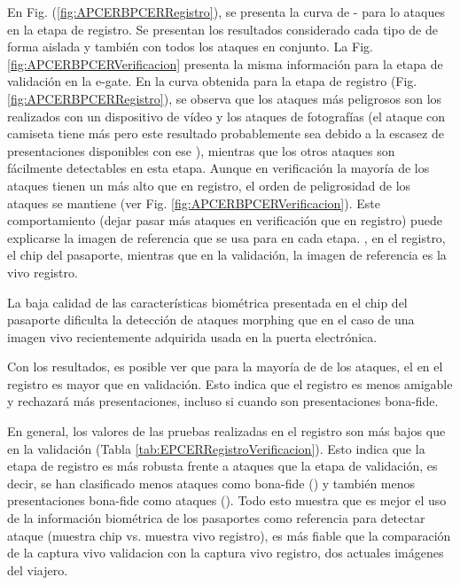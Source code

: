 En Fig. (\ref{fig:APCERBPCERRegistro}), se presenta la curva  de - para lo ataques en la etapa de registro. Se presentan los resultados considerado cada tipo de  de forma aislada y también con  todos los ataques en conjunto. La Fig. \ref{fig:APCERBPCERVerificacion} presenta la misma información para la etapa de validación en la \gls{e-gate}. En la curva obtenida para la etapa de registro (Fig. \ref{fig:APCERBPCERRegistro}), se observa que los ataques más peligrosos son los realizados con un dispositivo de vídeo y los ataques de fotografías (el ataque con camiseta tiene más  pero este resultado probablemente sea debido a la escasez de presentaciones disponibles con ese ), mientras que los otros ataques son fácilmente detectables en esta etapa. Aunque en verificación la mayoría de los ataques tienen un  más alto que en registro, el orden de  peligrosidad de los ataques se mantiene (ver Fig. \ref{fig:APCERBPCERVerificacion}). Este comportamiento (dejar pasar más ataques en verificación que en registro) puede explicarse la imagen de referencia que se usa para en cada etapa. , en el registro, el \gls{chip} del pasaporte, mientras que en la validación, la imagen de referencia es la \gls{vivo registro}. 

La baja calidad de las características biométrica presentada en el \gls{chip} del pasaporte dificulta la detección de ataques \gls{morphing} que en el caso de una imagen \gls{vivo} recientemente adquirida usada en la puerta electrónica. 

Con los resultados, es posible ver que para la mayoría de de los ataques, el  en el registro es mayor que en validación. Esto indica que el registro es menos amigable y rechazará más presentaciones, incluso si cuando son  presentaciones \gls{bona-fide}.

En general, los valores  de las pruebas realizadas en el registro son más bajos que en la validación (Tabla \ref{tab:EPCERRegistroVerificacion}). Esto indica que la etapa de registro es más robusta frente a ataques que la etapa de validación, es decir, se han clasificado menos ataques como \gls{bona-fide} () y también menos presentaciones \gls{bona-fide} como ataques (). Todo esto muestra que es mejor el uso de la información biométrica de los pasaportes como referencia para detectar ataque (muestra \gls{chip} vs. muestra \gls{vivo registro}), es más fiable que la comparación de la captura \gls{vivo validacion} con la captura \gls{vivo registro}, dos actuales imágenes del viajero.

